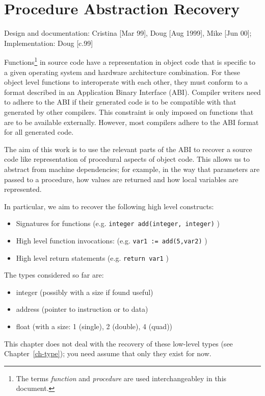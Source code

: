 %
%

\chapter{Procedure Abstraction Recovery}
\label{ch-call}

{\small
\begin{flushright}
Design and documentation: Cristina [Mar 99], Doug [Aug 1999],
	Mike [Jun 00]; Implementation: Doug [c.99]
\end{flushright} 
}

Functions\footnote{The terms {\it function} and {\it procedure}
are used interchangeabley in this document.} in source code
have a representation in object code that is specific to a given
operating system and hardware architecture combination. For these
object level functions to interoperate with each other, they must
conform to a format described in an Application Binary Interface
(ABI). Compiler writers need to adhere to the ABI if their generated
code is to be compatible with that generated by other compilers. This
constraint is only imposed on functions that are to be available
externally. However, most compilers adhere to the ABI format for
all generated code.

The aim of this work is to use the relevant parts of the ABI to
recover a source code like representation of procedural aspects of
object code. This allows us to abstract from machine dependencies;
for example, in the way that parameters are passed to a procedure,
how values are returned and how local variables are represented.

In particular, we aim to recover the following high level constructs:

\begin{itemize}
\item Signatures for functions (e.g. {\tt integer add(integer, integer)} )
\item High level function invocations: (e.g. {\tt var1 := add(5,var2)} )
\item High level return statements (e.g. {\tt return var1} )
\end{itemize}

The types considered so far are:
\begin{itemize}
\item integer (possibly with a size if found useful)
\item address (pointer to instruction or to data)
\item float (with a size: 1 (single), 2 (double), 4 (quad))
\end{itemize}
This chapter does not deal with the recovery of these low-level types 
(see Chapter~\ref{ch-type}); you need assume that only they exist for now.


